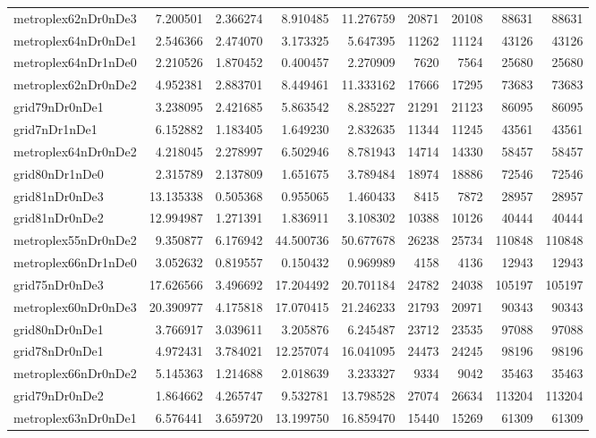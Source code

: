 \begin{longtable}{|l|r|r|r|r|r|r|r|r|}
metroplex62nDr0nDe3 & 7.200501 & 2.366274 & 8.910485 & 11.276759 & 20871 & 20108 & 88631 & 88631 \\
metroplex64nDr0nDe1 & 2.546366 & 2.474070 & 3.173325 & 5.647395 & 11262 & 11124 & 43126 & 43126 \\
metroplex64nDr1nDe0 & 2.210526 & 1.870452 & 0.400457 & 2.270909 & 7620 & 7564 & 25680 & 25680 \\
metroplex62nDr0nDe2 & 4.952381 & 2.883701 & 8.449461 & 11.333162 & 17666 & 17295 & 73683 & 73683 \\
grid79nDr0nDe1 & 3.238095 & 2.421685 & 5.863542 & 8.285227 & 21291 & 21123 & 86095 & 86095 \\
grid7nDr1nDe1 & 6.152882 & 1.183405 & 1.649230 & 2.832635 & 11344 & 11245 & 43561 & 43561 \\
metroplex64nDr0nDe2 & 4.218045 & 2.278997 & 6.502946 & 8.781943 & 14714 & 14330 & 58457 & 58457 \\
grid80nDr1nDe0 & 2.315789 & 2.137809 & 1.651675 & 3.789484 & 18974 & 18886 & 72546 & 72546 \\
grid81nDr0nDe3 & 13.135338 & 0.505368 & 0.955065 & 1.460433 & 8415 & 7872 & 28957 & 28957 \\
grid81nDr0nDe2 & 12.994987 & 1.271391 & 1.836911 & 3.108302 & 10388 & 10126 & 40444 & 40444 \\
metroplex55nDr0nDe2 & 9.350877 & 6.176942 & 44.500736 & 50.677678 & 26238 & 25734 & 110848 & 110848 \\
metroplex66nDr1nDe0 & 3.052632 & 0.819557 & 0.150432 & 0.969989 & 4158 & 4136 & 12943 & 12943 \\
grid75nDr0nDe3 & 17.626566 & 3.496692 & 17.204492 & 20.701184 & 24782 & 24038 & 105197 & 105197 \\
metroplex60nDr0nDe3 & 20.390977 & 4.175818 & 17.070415 & 21.246233 & 21793 & 20971 & 90343 & 90343 \\
grid80nDr0nDe1 & 3.766917 & 3.039611 & 3.205876 & 6.245487 & 23712 & 23535 & 97088 & 97088 \\
grid78nDr0nDe1 & 4.972431 & 3.784021 & 12.257074 & 16.041095 & 24473 & 24245 & 98196 & 98196 \\
metroplex66nDr0nDe2 & 5.145363 & 1.214688 & 2.018639 & 3.233327 & 9334 & 9042 & 35463 & 35463 \\
grid79nDr0nDe2 & 1.864662 & 4.265747 & 9.532781 & 13.798528 & 27074 & 26634 & 113204 & 113204 \\
metroplex63nDr0nDe1 & 6.576441 & 3.659720 & 13.199750 & 16.859470 & 15440 & 15269 & 61309 & 61309 \\

\end{longtable}
